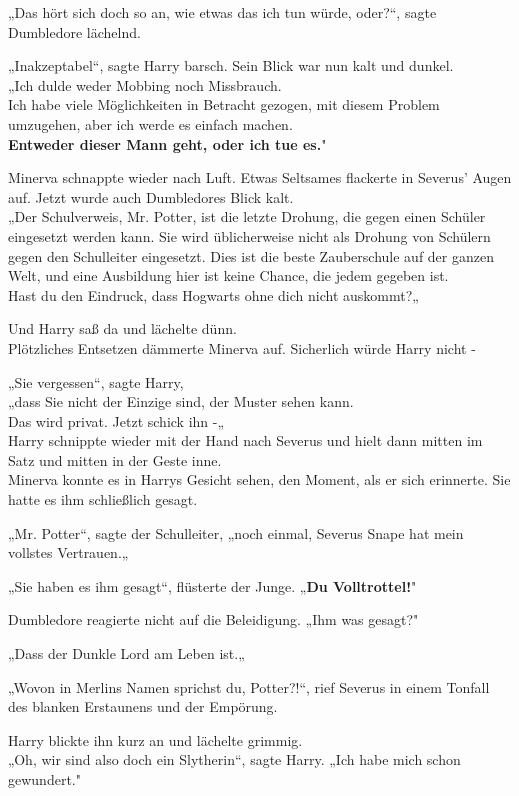 {„Das hört sich doch so an, wie etwas das ich tun würde, oder?“, sagte Dumbledore lächelnd.

„Inakzeptabel“, sagte Harry barsch. Sein Blick war nun kalt und dunkel.\\ „Ich dulde weder Mobbing noch Missbrauch.\\ Ich habe viele Möglichkeiten in Betracht gezogen, mit diesem Problem umzugehen, aber ich werde es einfach machen.\\ \textbf{Entweder dieser Mann geht, oder ich tue es.}"

Minerva schnappte wieder nach Luft. Etwas Seltsames flackerte in Severus' Augen auf. Jetzt wurde auch Dumbledores Blick kalt.\\ „Der Schulverweis, Mr. Potter, ist die letzte Drohung, die gegen einen Schüler eingesetzt werden kann. Sie wird üblicherweise nicht als Drohung von Schülern gegen den Schulleiter eingesetzt. Dies ist die beste Zauberschule auf der ganzen Welt, und eine Ausbildung hier ist keine Chance, die jedem gegeben ist.\\ Hast du den Eindruck, dass Hogwarts ohne dich nicht auskommt?„

Und Harry saß da und lächelte dünn.\\ Plötzliches Entsetzen dämmerte Minerva auf. Sicherlich würde Harry nicht -

„Sie vergessen“, sagte Harry,\\ „dass Sie nicht der Einzige sind, der Muster sehen kann.\\ Das wird privat. Jetzt schick ihn -„\\ Harry schnippte wieder mit der Hand nach Severus und hielt dann mitten im Satz und mitten in der Geste inne.\\ Minerva konnte es in Harrys Gesicht sehen, den Moment, als er sich erinnerte. Sie hatte es ihm schließlich gesagt.

„Mr. Potter“, sagte der Schulleiter, „noch einmal, Severus Snape hat mein vollstes Vertrauen.„

„Sie haben es ihm gesagt“, flüsterte der Junge. „\textbf{Du Volltrottel!}"

Dumbledore reagierte nicht auf die Beleidigung. „Ihm was gesagt?"

„Dass der Dunkle Lord am Leben ist.„

„Wovon in Merlins Namen sprichst du, Potter?!“, rief Severus in einem Tonfall des blanken Erstaunens und der Empörung.

Harry blickte ihn kurz an und lächelte grimmig.\\ „Oh, wir sind also doch ein Slytherin“, sagte Harry. „Ich habe mich schon gewundert."

}
